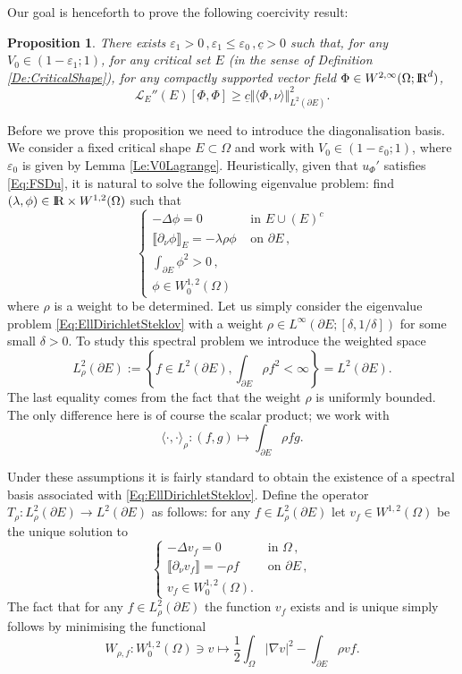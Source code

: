\documentclass{article}
\newcommand{\R}{\textnormal{I\kern-0.21emR}}
\renewcommand{\geq}{\geqslant}
\renewcommand{\leq}{\leqslant}
\def\e{{\varepsilon}}
\newtheorem{proposition}[material]{Proposition}
\def\O{{\Omega}}
\def\n{{\nabla}}
\numberwithin{equation}{section}
\begin{document}
Our goal is henceforth to prove the following coercivity result:
\begin{proposition}\label{Pr:CriticalCoercivity}There exists $\e_1>0\,, \e_1\leq \e_0\,, \underline c>0$ such that, for any $V_0\in (1-\e_1;1)$, for any critical set $E$ (in the sense of Definition \ref{De:CriticalShape}), for any compactly supported vector field $\Phi\in W^{2,\infty}(\O;\R^d)$, 
\[ \mathscr L_E''(E)[\Phi,\Phi]\geq \underline c\Vert \langle \Phi,\nu\rangle\Vert_{L^2(\partial E)}^2.\]
\end{proposition}
Before we prove this proposition we need to introduce the diagonalisation basis.
We consider a fixed critical shape $E\subset \O$ and work with $V_0\in (1-\e_0;1)$, where $\e_0$ is given by Lemma \ref{Le:V0Lagrange}. Heuristically, given that $u_\Phi'$ satisfies \eqref{Eq:FSDu}, it is natural to solve the following eigenvalue problem:  find $(\lambda,\phi)\in \R\times W^{1,2}(\O)$ such that
 \begin{equation}\label{Eq:EllDirichletSteklov}
 \begin{cases}
 -\Delta \phi=0&\text{ in }E\cup \left(E\right)^c
 \\ \llbracket \partial_\nu \phi\rrbracket_{E}=-\lambda \rho \phi&\text{ on } \partial E\,, 
 \\ \int_{\partial E} \phi^2>0\,, 
 \\ \phi \in W^{1,2}_0(\O)
 \end{cases}
 \end{equation}
where $\rho$ is a weight to be determined. Let us simply consider the eigenvalue problem \eqref{Eq:EllDirichletSteklov} with a weight $\rho \in L^\infty(\partial E;[\delta,1/\delta])$ for some small $\delta>0$. To study this spectral problem we introduce the weighted space
$$L^2_{\rho}(\partial E):=\left\{f\in L^2(\partial E), \int_{\partial E}\rho f^2<\infty\right\}=L^2(\partial E).$$ The last equality comes from the fact that the weight $\rho$ is uniformly bounded. The only difference here is of course the scalar product; we work with 
\[ \langle\cdot,\cdot\rangle_\rho:(f,g)\mapsto \int_{\partial E}\rho f g.\]

Under these assumptions it is fairly standard to obtain the existence of a spectral basis associated with \eqref{Eq:EllDirichletSteklov}. Define the operator $T_\rho:L^2_\rho(\partial E)\to L^2(\partial E)$ as follows: for any $f\in L^2_\rho(\partial E)$  let $v_f\in W^{1,2}(\O)$ be the unique solution to 
\begin{equation}\label{Eq:Aux}
\begin{cases}
-\Delta v_f=0	&\text{ in }\O\,, 
\\ \llbracket\partial_\nu v_f\rrbracket=-\rho f&\text{  on }\partial E\,, 
\\ v_f\in W^{1,2}_0(\O).\end{cases}\end{equation} 
The fact that for any $f\in L^2_\rho(\partial E)$ the function $v_f$ exists and is unique simply follows by minimising the functional
\[ W_{\rho,f}:W^{1,2}_0(\O)\ni v\mapsto \frac12\int_\O|\n v|^2-\int_{\partial E} \rho v f.\] %
\end{document}
